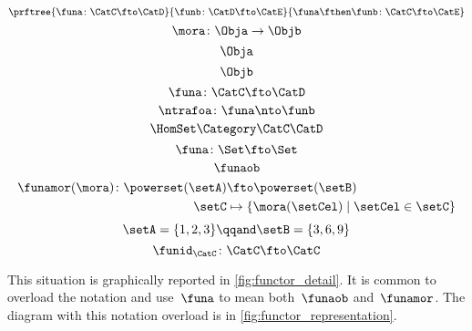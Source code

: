{\begin{forslides}
\begin{equation}
		\end{equation}
		\begin{equation}
			\label{eq:functor-composition1}
			\prftree{\funa\colon \CatC \fto \CatD}{\funb\colon\CatD\fto\CatE}{\funa\fthen\funb\colon \CatC \fto \CatE}
		\end{equation}
		\begin{equation}
			\label{eq:slides_mora}
			\mora\colon \Obja\to\Objb
		\end{equation}
		\begin{equation}
			\label{eq:slides_mora_obja}
			\Obja
		\end{equation}
		\begin{equation}
			\label{eq:slides_mora_objb}
			\Objb
		\end{equation}
		\begin{equation}
			\label{eq:slides_funa}
			\funa\colon\CatC\fto\CatD
		\end{equation}
		\begin{equation}
			\label{eq:slides_ntrafoa}
			\ntrafoa\colon\funa\nto\funb
		\end{equation}
		\begin{equation}
			\label{eq:slides_hom}
			\HomSet\Category\CatC\CatD
		\end{equation}
		\begin{equation}
			\label{eq:pow_fun_1}
			\funa\colon \Set \fto \Set
		\end{equation}
		\begin{equation}
			\label{eq:pow_fun_2}
			\funaob
		\end{equation}
		\begin{equation}
			\label{eq:pow_fun_3}
			\begin{aligned}
				\funamor(\mora)\colon \powerset(\setA) & \fto \powerset(\setB)                              \\
				\setC                                  & \mapsto \{ \mora(\setCel) \mid \setCel \in \setC\}
			\end{aligned}
		\end{equation}
		\begin{equation}
			\label{eq:pow_fun_4}
			\setA=\{ 1,2,3\} \qqand \setB=\{3,6,9\}
		\end{equation}
		\begin{equation}
			\label{eq:idfun}
			\funid_\CatC \colon \CatC \fto \CatC
		\end{equation}
	\end{forslides}
}

This situation is graphically reported in \cref{fig:functor_detail}.
%
It is common to overload the notation and use~$\funa$ to mean both~$\funaob$ and~$\funamor$.
The diagram with this notation overload is in \cref{fig:functor_representation}.

